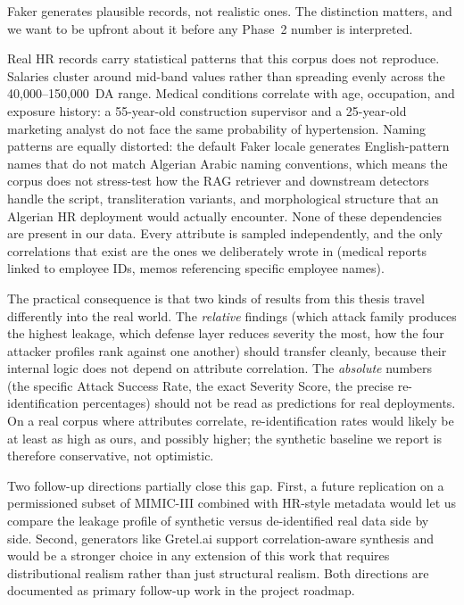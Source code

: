 \documentclass[12pt, a4paper]{report}
\begin{document}
Faker generates plausible records, not realistic ones. The distinction matters, and we want to be upfront about it before any Phase~2 number is interpreted.

Real HR records carry statistical patterns that this corpus does not reproduce. Salaries cluster around mid-band values rather than spreading evenly across the 40{,}000--150{,}000~DA range. Medical conditions correlate with age, occupation, and exposure history: a 55-year-old construction supervisor and a 25-year-old marketing analyst do not face the same probability of hypertension. Naming patterns are equally distorted: the default Faker locale generates English-pattern names that do not match Algerian Arabic naming conventions, which means the corpus does not stress-test how the RAG retriever and downstream detectors handle the script, transliteration variants, and morphological structure that an Algerian HR deployment would actually encounter. None of these dependencies are present in our data. Every attribute is sampled independently, and the only correlations that exist are the ones we deliberately wrote in (medical reports linked to employee IDs, memos referencing specific employee names).

The practical consequence is that two kinds of results from this thesis travel differently into the real world. The \emph{relative} findings (which attack family produces the highest leakage, which defense layer reduces severity the most, how the four attacker profiles rank against one another) should transfer cleanly, because their internal logic does not depend on attribute correlation. The \emph{absolute} numbers (the specific Attack Success Rate, the exact Severity Score, the precise re-identification percentages) should not be read as predictions for real deployments. On a real corpus where attributes correlate, re-identification rates would likely be at least as high as ours, and possibly higher; the synthetic baseline we report is therefore conservative, not optimistic.

Two follow-up directions partially close this gap. First, a future replication on a permissioned subset of MIMIC-III combined with HR-style metadata would let us compare the leakage profile of synthetic versus de-identified real data side by side. Second, generators like Gretel.ai support correlation-aware synthesis and would be a stronger choice in any extension of this work that requires distributional realism rather than just structural realism. Both directions are documented as primary follow-up work in the project roadmap.
\end{document}
